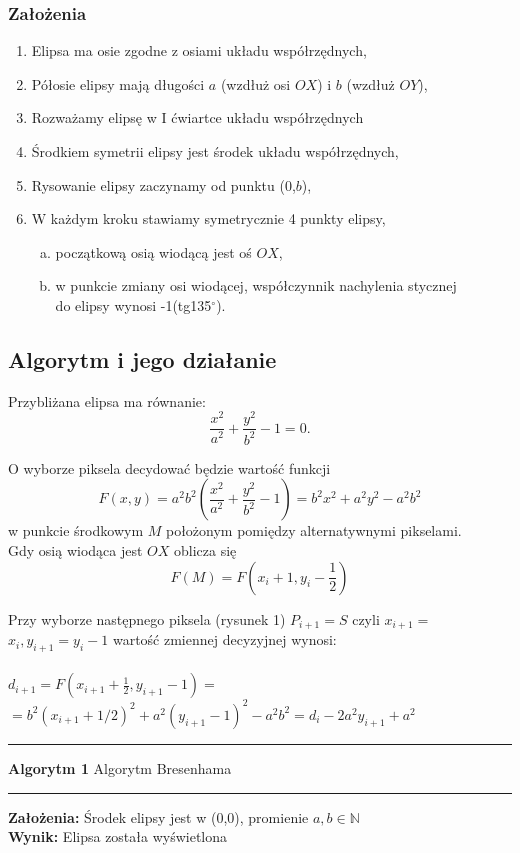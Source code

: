 \documentclass{article}
\begin{document}
\subsubsection{Założenia}
\begin{enumerate}
    \item Elipsa ma osie zgodne z osiami układu współrzędnych,
    \item Półosie elipsy mają długości $a$ (wzdłuż osi $OX$) i $b$ (wzdłuż $OY$),
    \item Rozważamy elipsę w I ćwiartce układu współrzędnych
    \item Środkiem symetrii elipsy jest środek układu współrzędnych,
    \item Rysowanie elipsy zaczynamy od punktu (0,$b$),
    \item  W każdym kroku stawiamy symetrycznie 4 punkty elipsy,
        \begin{enumerate}[(a)]
            \item początkową osią wiodącą jest oś $OX$,
            \item w punkcie zmiany osi wiodącej, współczynnik nachylenia stycznej \\
                  do elipsy wynosi -1(tg135$^\circ$).
        \end{enumerate}
\end{enumerate}

\subsection{Algorytm i jego działanie}
Przybliżana elipsa ma równanie:
$$\frac{x^2}{a^2}+\frac{y^2}{b^2}-1=0.$$

O wyborze piksela decydować będzie wartość funkcji
$$F(x,y)=a^2b^2\left(\frac{x^2}{a^2}+\frac{y^2}{b^2}-1\right)=b^2x^2+a^2y^2-a^2b^2$$
w punkcie środkowym $M$ położonym pomiędzy alternatywnymi pikselami.\\
Gdy osią wiodąca jest $OX$ oblicza się
$$F(M)=F\left(x_i+1,y_i-\frac{1}{2}\right)$$

Przy wyborze następnego piksela (rysunek 1) $P_{i+1} = S$ czyli $x_{i+1} =$ \\
$x_i,y_{i+1}=y_i-1$ wartość zmiennej decyzyjnej wynosi: \\ \\
$d_{i+1}=F\left(x_{i+1}+\frac{1}{2},y_{i+1}-1\right)=$\\

$=b^2(x_{i+1}+1/2)^2+a^2(y_{i+1}-1)^2-a^2b^2=d_i-2a^2y_{i+1}+a^2$ \\
\rule[0.05cm]{\textwidth}{1pt} 
\textbf{Algorytm 1} Algorytm Bresenhama \\
\rule[0.05cm]{\textwidth}{1pt}
\textbf{Założenia:} Środek elipsy jest w (0,0), promienie $a,b \in\mathbb{N}$ \\
\textbf{Wynik:} Elipsa została wyświetlona
\end{document}
